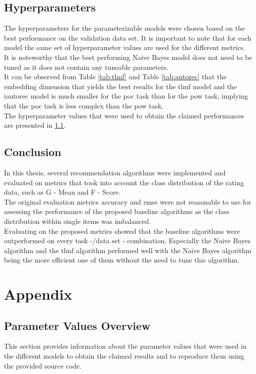 \subsection{Hyperparameters}
\label{chap:hyperparams}
The hyperparameters for the parameterizable models were chosen based on the best performance on the validation data set. It is important to note that for each model the same set of hyperparameter values are used for the different metrics.\\
It is noteworthy that the best performing Naive Bayes model does not need to be tuned as it does not contain any tuneable parameters.\\
It can be observed from Table \ref{tab:tlmf} and Table \ref{tab:autorec} that the embedding dimension that yields the best results for the \acrshort{tlmf} model and the \acrshort{iautorec} model is much smaller for the \acrshort{poc} task than for the \acrshort{pow} task, implying that the \acrshort{poc} task is less complex than the \acrshort{pow} task.\\ 
The hyperparameter values that were used to obtain the claimed performances are presented in \ref{chap:pvo}.

\subsection{Conclusion}
In this thesis, several recommendation algorithms were implemented and evaluated on metrics that took into account the class distribution of the rating data, such as G - Mean and F - Score.\\
The original evaluation metrics accuracy and rmse were not reasonable to use for assessing the performance of the proposed baseline algorithms as the class distribution within single items was imbalanced.\\
Evaluating on the proposed metrics showed that the baseline algorithms were outperformed on every task -/data set - combination. Especially the Naive Bayes algorithm and the \acrshort{tlmf} algorithm performed well with the Naive Bayes algorithm being the more efficient one of them without the need to tune this algorithm.
 
\clearpage
\section{Appendix}
\label{sec:appendix}
\subsection{Parameter Values Overview}
\label{chap:pvo}
This section provides information about the parameter values that were used in the different models to obtain the claimed results and to reproduce them using the provided source code.

